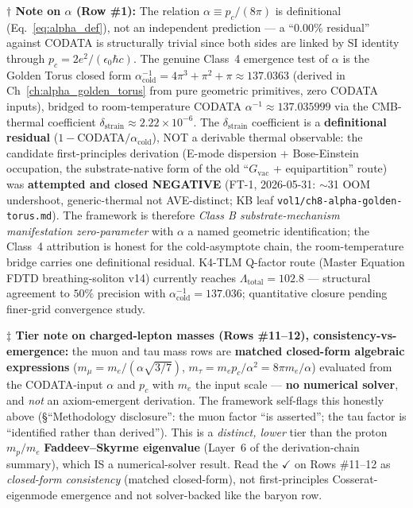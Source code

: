 \vspace{0.5em}
\noindent
\textbf{$\dagger$ Note on $\alpha$ (Row \#1):} The relation $\alpha \equiv p_c/(8\pi)$ is definitional (Eq.~\ref{eq:alpha_def}), not an independent prediction --- a ``$0.00\%$ residual'' against CODATA is structurally trivial since both sides are linked by SI identity through $p_c = 2e^2/(\epsilon_0 \hbar c)$. The genuine Class~4 emergence test of $\alpha$ is the Golden Torus closed form $\alpha_{\text{cold}}^{-1} = 4\pi^3 + \pi^2 + \pi \approx 137.0363$ (derived in Ch~\ref{ch:alpha_golden_torus} from pure geometric primitives, zero CODATA inputs), bridged to room-temperature CODATA $\alpha^{-1} \approx 137.035999$ via the CMB-thermal coefficient $\delta_{\text{strain}} \approx 2.22 \times 10^{-6}$. The $\delta_{\text{strain}}$ coefficient is a \textbf{definitional residual} ($1-$CODATA$/\alpha_{\text{cold}}$), NOT a derivable thermal observable: the candidate first-principles derivation (E-mode dispersion + Bose-Einstein occupation, the substrate-native form of the old ``$G_{\text{vac}}$ + equipartition'' route) was \textbf{attempted and closed NEGATIVE} (FT-1, 2026-05-31: $\sim$31 OOM undershoot, generic-thermal not AVE-distinct; KB leaf \texttt{vol1/ch8-alpha-golden-torus.md}). The framework is therefore \emph{Class B substrate-mechanism manifestation zero-parameter} with $\alpha$ a named geometric identification; the Class~4 attribution is honest for the cold-asymptote chain, the room-temperature bridge carries one definitional residual. K4-TLM Q-factor route (Master Equation FDTD breathing-soliton v14) currently reaches $\Lambda_{\text{total}} = 102.8$ --- structural agreement to $50\%$ precision with $\alpha_{\text{cold}}^{-1} = 137.036$; quantitative closure pending finer-grid convergence study.

\vspace{0.5em}
\noindent
\textbf{$\ddagger$ Tier note on charged-lepton masses (Rows \#11--12), consistency-vs-emergence:} the muon and tau mass rows are \textbf{matched closed-form algebraic expressions} ($m_\mu = m_e/(\alpha\sqrt{3/7})$, $m_\tau = m_e p_c/\alpha^2 = 8\pi m_e/\alpha$) evaluated from the CODATA-input $\alpha$ and $p_c$ with $m_e$ the input scale --- \textbf{no numerical solver}, and \emph{not} an axiom-emergent derivation. The framework self-flags this honestly above (\S``Methodology disclosure'': the muon factor ``is asserted''; the tau factor is ``identified rather than derived''). This is a \emph{distinct, lower} tier than the proton $m_p/m_e$ \textbf{Faddeev--Skyrme eigenvalue} (Layer~6 of the derivation-chain summary), which IS a numerical-solver result. Read the $\checkmark$ on Rows \#11--12 as \emph{closed-form consistency} (matched closed-form), not first-principles Cosserat-eigenmode emergence and not solver-backed like the baryon row.

